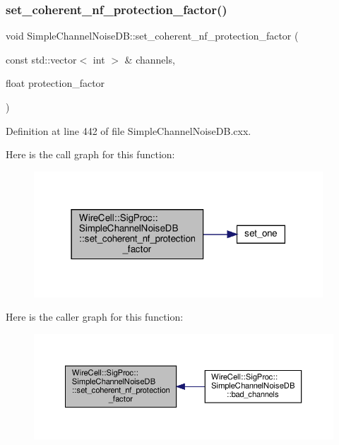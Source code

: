\subsubsection{\texorpdfstring{set\+\_\+coherent\+\_\+nf\+\_\+protection\+\_\+factor()}{set\_coherent\_nf\_protection\_factor()}}
{\footnotesize\ttfamily void Simple\+Channel\+Noise\+D\+B\+::set\+\_\+coherent\+\_\+nf\+\_\+protection\+\_\+factor (\begin{DoxyParamCaption}\item[{const std\+::vector$<$ int $>$ \&}]{channels,  }\item[{float}]{protection\+\_\+factor }\end{DoxyParamCaption})}



Definition at line 442 of file Simple\+Channel\+Noise\+D\+B.\+cxx.

Here is the call graph for this function\+:
\nopagebreak
\begin{figure}[H]
\begin{center}
\leavevmode
\includegraphics[width=307pt]{class_wire_cell_1_1_sig_proc_1_1_simple_channel_noise_d_b_a1a1ea9a4e47ddfe6c88f9eec682776bf_cgraph}
\end{center}
\end{figure}
Here is the caller graph for this function\+:
\nopagebreak
\begin{figure}[H]
\begin{center}
\leavevmode
\includegraphics[width=350pt]{class_wire_cell_1_1_sig_proc_1_1_simple_channel_noise_d_b_a1a1ea9a4e47ddfe6c88f9eec682776bf_icgraph}
\end{center}
\end{figure}
\mbox{\label{class_wire_cell_1_1_sig_proc_1_1_simple_channel_noise_d_b_a92f9ca90518ecd1833bb3e4dfcbf9488}} 
